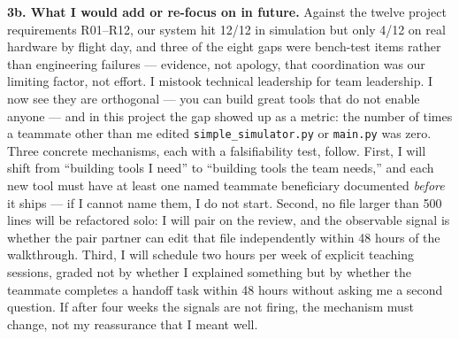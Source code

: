 \textbf{3b. What I would add or re-focus on in future.} Against the twelve project requirements R01--R12, our system hit 12/12 in simulation but only 4/12 on real hardware by flight day, and three of the eight gaps were bench-test items rather than engineering failures --- evidence, not apology, that coordination was our limiting factor, not effort. I mistook technical leadership for team leadership. I now see they are orthogonal --- you can build great tools that do not enable anyone --- and in this project the gap showed up as a metric: the number of times a teammate other than me edited \texttt{simple\_simulator.py} or \texttt{main.py} was zero. Three concrete mechanisms, each with a falsifiability test, follow. First, I will shift from ``building tools I need'' to ``building tools the team needs,'' and each new tool must have at least one named teammate beneficiary documented \emph{before} it ships --- if I cannot name them, I do not start. Second, no file larger than 500 lines will be refactored solo: I will pair on the review, and the observable signal is whether the pair partner can edit that file independently within 48 hours of the walkthrough. Third, I will schedule two hours per week of explicit teaching sessions, graded not by whether I explained something but by whether the teammate completes a handoff task within 48 hours without asking me a second question. If after four weeks the signals are not firing, the mechanism must change, not my reassurance that I meant well.
